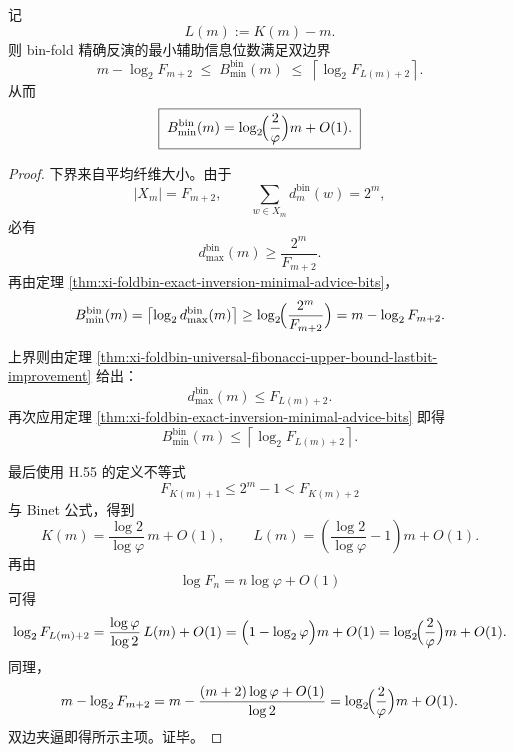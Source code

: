 \begin{theorem}\label{thm:xi-foldbin-exact-inversion-advice-rate-log-two-over-phi}
记
\[
L(m):=K(m)-m.
\]
则 bin-fold 精确反演的最小辅助信息位数满足双边界
\[
\boxed{\;
m-\log_2F_{m+2}
\;\le\;
B_{\min}^{\mathrm{bin}}(m)
\;\le\;
\left\lceil \log_2F_{L(m)+2}\right\rceil.\;}
\]
从而
\[
\boxed{\;
B_{\min}^{\mathrm{bin}}(m)
=
\log_2\!\Bigl(\frac{2}{\varphi}\Bigr)m+O(1).\;}
\]
\end{theorem}
\begin{proof}
下界来自平均纤维大小。由于
\[
|X_m|=F_{m+2},
\qquad
\sum_{w\in X_m}d_m^{\mathrm{bin}}(w)=2^m,
\]
必有
\[
d_{\max}^{\mathrm{bin}}(m)\ge \frac{2^m}{F_{m+2}}.
\]
再由定理 \ref{thm:xi-foldbin-exact-inversion-minimal-advice-bits}，
\[
B_{\min}^{\mathrm{bin}}(m)
=
\left\lceil \log_2 d_{\max}^{\mathrm{bin}}(m)\right\rceil
\ge
\log_2\!\Bigl(\frac{2^m}{F_{m+2}}\Bigr)
=
m-\log_2F_{m+2}.
\]

上界则由定理 \ref{thm:xi-foldbin-universal-fibonacci-upper-bound-lastbit-improvement} 给出：
\[
d_{\max}^{\mathrm{bin}}(m)\le F_{L(m)+2}.
\]
再次应用定理 \ref{thm:xi-foldbin-exact-inversion-minimal-advice-bits} 即得
\[
B_{\min}^{\mathrm{bin}}(m)\le \left\lceil \log_2F_{L(m)+2}\right\rceil.
\]

最后使用 H.55 的定义不等式
\[
F_{K(m)+1}\le 2^m-1<F_{K(m)+2}
\]
与 Binet 公式，得到
\[
K(m)=\frac{\log 2}{\log\varphi}\,m+O(1),
\qquad
L(m)=\left(\frac{\log 2}{\log\varphi}-1\right)m+O(1).
\]
再由
\[
\log F_n=n\log\varphi+O(1)
\]
可得
\[
\log_2F_{L(m)+2}
=
\frac{\log\varphi}{\log 2}\,L(m)+O(1)
=
\Bigl(1-\log_2\varphi\Bigr)m+O(1)
=
\log_2\!\Bigl(\frac{2}{\varphi}\Bigr)m+O(1).
\]
同理，
\[
m-\log_2F_{m+2}
=
m-\frac{(m+2)\log\varphi+O(1)}{\log 2}
=
\log_2\!\Bigl(\frac{2}{\varphi}\Bigr)m+O(1).
\]
双边夹逼即得所示主项。证毕。
\end{proof}

